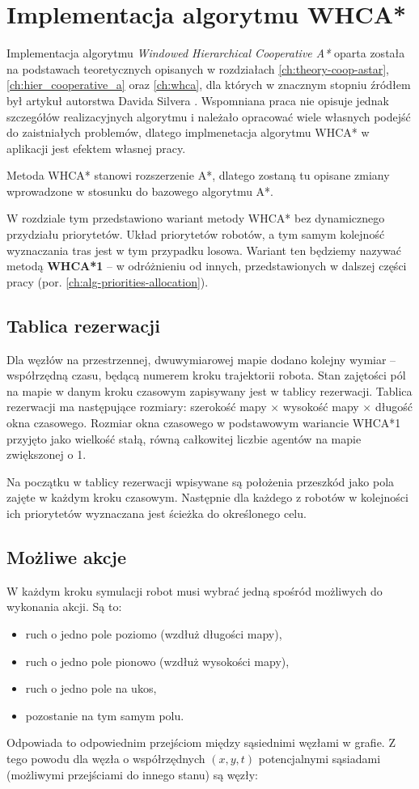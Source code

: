 \section{Implementacja algorytmu WHCA*}
\label{ch:alg-whca}

Implementacja algorytmu {\it  Windowed Hierarchical Cooperative A*} oparta została na podstawach teoretycznych opisanych w rozdziałach \ref{ch:theory-coop-astar}, \ref{ch:hier_cooperative_a} oraz \ref{ch:whca}, dla których w znacznym stopniu źródłem był artykuł autorstwa Davida Silvera \cite{cooppath}.
Wspomniana praca nie opisuje jednak szczegółów realizacyjnych algorytmu i należało opracować wiele własnych podejść do zaistniałych problemów, dlatego implmenetacja algorytmu WHCA* w aplikacji jest efektem własnej pracy.

Metoda WHCA* stanowi rozszerzenie A*, dlatego zostaną tu opisane zmiany wprowadzone w stosunku do bazowego algorytmu A*.

W rozdziale tym przedstawiono wariant metody WHCA* bez dynamicznego przydziału priorytetów.
Układ priorytetów robotów, a tym samym kolejność wyznaczania tras jest w tym przypadku losowa.
Wariant ten będziemy nazywać metodą {\bf WHCA*1} -- w odróżnieniu od innych, przedstawionych w dalszej części pracy (por. \ref{ch:alg-priorities-allocation}). 

\subsection{Tablica rezerwacji}
Dla węzłów na przestrzennej, dwuwymiarowej mapie dodano kolejny wymiar -- współrzędną czasu, będącą numerem kroku trajektorii robota.
Stan zajętości pól na mapie w danym kroku czasowym zapisywany jest w tablicy rezerwacji.
Tablica rezerwacji ma następujące rozmiary: szerokość mapy $\times$ wysokość mapy $\times$ długość okna czasowego.
Rozmiar okna czasowego w podstawowym wariancie WHCA*1 przyjęto jako wielkość stałą, równą całkowitej liczbie agentów na mapie zwiększonej o 1.

Na początku w tablicy rezerwacji wpisywane są położenia przeszkód jako pola zajęte w każdym kroku czasowym.
Następnie dla każdego z robotów w kolejności ich priorytetów wyznaczana jest ścieżka do określonego celu.

\subsection{Możliwe akcje}
W każdym kroku symulacji robot musi wybrać jedną spośród możliwych do wykonania akcji. Są to:
\begin{itemize}
	\item ruch o jedno pole poziomo (wzdłuż długości mapy),
	\item ruch o jedno pole pionowo (wzdłuż wysokości mapy),
	\item ruch o jedno pole na ukos,
	\item pozostanie na tym samym polu.
\end{itemize}
Odpowiada to odpowiednim przejściom między sąsiednimi węzłami w grafie.
Z tego powodu dla węzła o współrzędnych $(x, y, t)$ potencjalnymi sąsiadami (możliwymi przejściami do innego stanu) są węzły:

